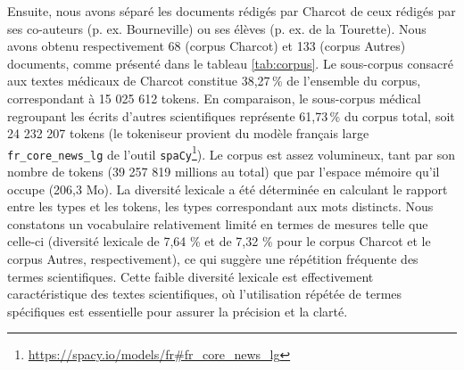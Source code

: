 
Ensuite, nous avons séparé les documents rédigés par Charcot de ceux rédigés par ses co-auteurs (p. ex. Bourneville) ou ses élèves (p. ex. de la Tourette). Nous avons obtenu respectivement 68 (corpus \og{}Charcot\fg{}) et 133 (corpus \og{}Autres\fg{}) documents, comme présenté dans le tableau \ref{tab:corpus}. Le sous-corpus consacré aux textes médicaux de Charcot constitue 38,27 \% de l’ensemble du corpus, correspondant à 15 025 612 tokens. En comparaison, le sous-corpus médical regroupant les écrits d'autres scientifiques représente 61,73 \% du corpus total, soit 24 232 207 tokens (le tokeniseur provient du modèle français large \texttt{fr\_core\_news\_lg} de l'outil \texttt{spaCy}\footnote{\url{https://spacy.io/models/fr\#fr_core_news_lg}}). Le corpus est assez volumineux, tant par son nombre de tokens (39 257 819 millions au total) que par l'espace mémoire qu'il occupe (206,3 Mo). La diversité lexicale a été déterminée en calculant le rapport entre les types et les tokens, les types correspondant aux mots distincts. Nous constatons un vocabulaire relativement limité en termes de mesures telle que celle-ci (diversité lexicale de 7,64 \% et de 7,32 \% pour le corpus Charcot et le corpus Autres, respectivement), ce qui suggère une répétition fréquente des termes scientifiques. Cette faible diversité lexicale est effectivement caractéristique des textes scientifiques, où l'utilisation répétée de termes spécifiques est essentielle pour assurer la précision et la clarté.

